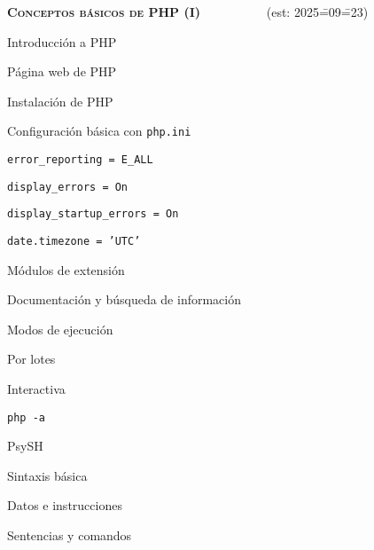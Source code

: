 \begin{longenum}
\begin{longenum}
\begin{longenum}
\begin{longenum}
            \end{longenum}
        \end{longenum}
    \end{longenum}
    \item \textbf{\textsc{Conceptos básicos de PHP (I)}} \ \ \ \ \ \ \ \ \ \ (est: 2025\==09\==23)
    \begin{longenum}
        \item Introducción a PHP
        \begin{longenum}
            \item Página web de PHP
            \item Instalación de PHP
            \item Configuración básica con \texttt{php.ini}
            \begin{longenum}
                \item \texttt{error\_reporting = E\_ALL}
                \item \texttt{display\_errors = On}
                \item \texttt{display\_startup\_errors = On}
                \item \texttt{date.timezone = 'UTC'}
            \end{longenum}
            \item Módulos de extensión
            \item Documentación y búsqueda de información
            \item Modos de ejecución \opcional\
            \begin{longenum}
                \item Por lotes
                \item Interactiva
                \begin{longenum}
                    \item \texttt{php -a}
                    \item PsySH
                \end{longenum}
            \end{longenum}
        \end{longenum}
        \item Sintaxis básica
        \begin{longenum}
            \item Datos e instrucciones
            \item Sentencias y comandos
            \begin{longenum}

\end{longenum}
\end{longenum}
\end{longenum}
\end{longenum}
